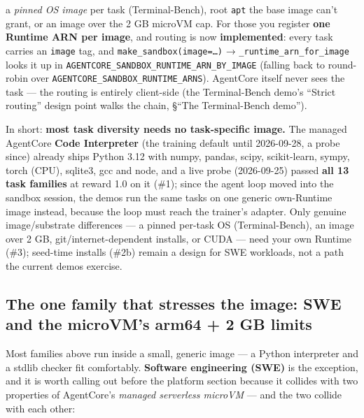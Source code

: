 \documentclass[
  paper=a4,
  ,captions=tableheading
]{scrartcl}
\begin{document}
\begin{enumerate}
  a \emph{pinned OS image} per task (Terminal-Bench), root \texttt{apt}
  the base image can't grant, or an image over the 2 GB microVM cap. For
  those you register \textbf{one Runtime ARN per image}, and routing is
  now \textbf{implemented}: every task carries an \texttt{image} tag,
  and \texttt{make\_sandbox(image=…)} →
  \texttt{\_runtime\_arn\_for\_image} looks it up in
  \texttt{AGENTCORE\_SANDBOX\_RUNTIME\_ARN\_BY\_IMAGE} (falling back to
  round-robin over \texttt{AGENTCORE\_SANDBOX\_RUNTIME\_ARNS}).
  AgentCore itself never sees the task --- the routing is entirely
  client-side (the Terminal-Bench demo's ``Strict routing'' design point
  walks the chain, §``The Terminal-Bench demo'').
\end{enumerate}

In short: \textbf{most task diversity needs no task-specific image.} The
managed AgentCore \textbf{Code Interpreter} (the training default until
2026-09-28, a probe since) already ships Python 3.12 with numpy, pandas,
scipy, scikit-learn, sympy, torch (CPU), sqlite3, gcc and node, and a
live probe (2026-09-25) passed \textbf{all 13 task families} at reward
1.0 on it (\#1); since the agent loop moved into the sandbox session,
the demos run the same tasks on one generic own-Runtime image instead,
because the loop must reach the trainer's adapter. Only genuine
image/substrate differences --- a pinned per-task OS (Terminal-Bench),
an image over 2 GB, git/internet-dependent installs, or CUDA --- need
your own Runtime (\#3); seed-time installs (\#2b) remain a design for
SWE workloads, not a path the current demos exercise.

\hypertarget{the-one-family-that-stresses-the-image-swe-and-the-microvms-arm64-2-gb-limits}{%
\subsection{The one family that stresses the image: SWE and the
microVM's arm64 + 2 GB
limits}\label{the-one-family-that-stresses-the-image-swe-and-the-microvms-arm64-2-gb-limits}}

Most families above run inside a small, generic image --- a Python
interpreter and a stdlib checker fit comfortably. \textbf{Software
engineering (SWE)} is the exception, and it is worth calling out before
the platform section because it collides with two properties of
AgentCore's \emph{managed serverless microVM} --- and the two collide
with each other:
\end{document}
